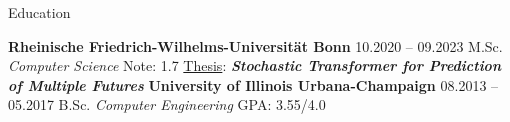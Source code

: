 \begin{rubric}{Education}


\entry*[]  \textbf{Rheinische Friedrich-Wilhelms-Universität Bonn} \hfill  10.2020 -- 09.2023   \newline
 M.Sc. \emph{Computer Science}  \hfill Note:  1.7 \newline
 \underline{Thesis}:  \hspace*{5mm} \textit{\textbf{Stochastic Transformer for Prediction of Multiple Futures}} \newline 
\entry*[]  \textbf{University of Illinois Urbana-Champaign} \hfill  08.2013 -- 05.2017 \newline
B.Sc. \emph{Computer Engineering} \hfill GPA: 3.55/4.0 \newline %



\end{rubric}